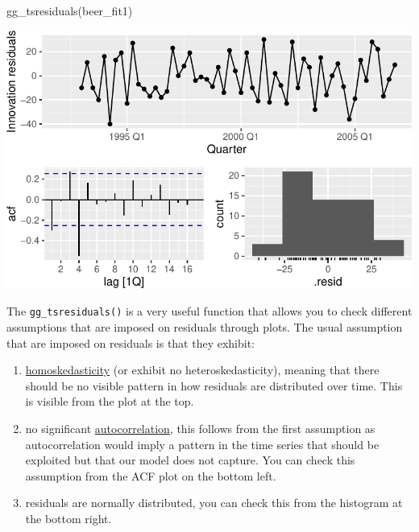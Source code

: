 \documentclass[
  letterpaper,
  DIV=11,
  numbers=noendperiod]{scrartcl}
\newenvironment{Shaded}{\begin{snugshade}}{\end{snugshade}}
\newcommand{\FunctionTok}[1]{\textcolor[rgb]{0.28,0.35,0.67}{#1}}
\newcommand{\NormalTok}[1]{\textcolor[rgb]{0.00,0.23,0.31}{#1}}
\providecommand{\tightlist}{%
  \setlength{\itemsep}{0pt}\setlength{\parskip}{0pt}}\usepackage{longtable,booktabs,array}
\begin{document}
\begin{Shaded}
\begin{Highlighting}[]
\FunctionTok{gg\_tsresiduals}\NormalTok{(beer\_fit1)}
\end{Highlighting}
\end{Shaded}

\begin{center}
\includegraphics{chapter5_review_files/figure-pdf/unnamed-chunk-28-1.pdf}
\end{center}

The \texttt{gg\_tsresiduals()} is a very useful function that allows you
to check different assumptions that are imposed on residuals through
plots. The usual assumption that are imposed on residuals is that they
exhibit:

\begin{enumerate}
\def\labelenumi{\arabic{enumi}.}
\tightlist
\item
  \href{https://en.wikipedia.org/wiki/Homoscedasticity_and_heteroscedasticity}{homoskedasticity}
  (or exhibit no heteroskedasticity), meaning that there should be no
  visible pattern in how residuals are distributed over time. This is
  visible from the plot at the top.
\item
  no significant
  \href{https://en.wikipedia.org/wiki/Autocorrelation}{autocorrelation},
  this follows from the first assumption as autocorrelation would imply
  a pattern in the time series that should be exploited but that our
  model does not capture. You can check this assumption from the ACF
  plot on the bottom left.
\item
  residuals are normally distributed, you can check this from the
  histogram at the bottom right.
\end{enumerate}
\end{document}
